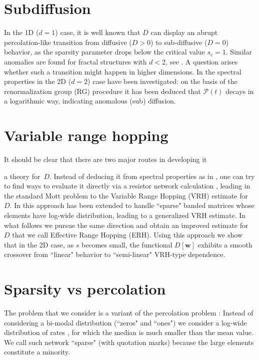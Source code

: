 \section{Subdiffusion}
In the 1D ($d{=}1$) case, it is well known \cite{alexander} that $D$ can display an abrupt 
percolation-like transition from diffusive (${D>0}$) to sub-diffusive (${D=0}$) 
behavior, as the sparsity parameter drops below the critical value ${s_c=1}$.
Similar anomalies are found for fractal structures with ${d<2}$, see \cite{granek,havlin}. 
A question arises whether such a transition might happen in higher dimensions.  
In \cite{amir} the spectral properties in the 2D ($d{=}2$) case 
have been investigated: on the basis of the renormalization group (RG) procedure 
it has been deduced that $\mathcal{P}(t)$ decays in a logarithmic way, 
indicating anomalous (sub) diffusion.  


\section{Variable range hopping}
It should be clear that there are two major routes in developing  it

a theory for~$D$. Instead of deducing it from spectral properties 
as in \cite{amir}, one can try to find ways to evaluate it directly 
via a resistor network calculation \cite{miller,AHL,Halp,pollak,VRHbook}, 
leading in the standard Mott problem to the Variable Range Hopping (VRH)
estimate for~$D$.   
%
In \cite{kbd,kbw,slk} this approach has been extended 
to handle ``sparse" banded matrices whose elements have log-wide distribution, 
leading to a generalized VRH estimate. 
In what follows we pursue the same direction and obtain an 
improved estimate for~$D$ that we call Effective Range Hopping (ERH).
Using this approach we show that in the 2D case, as $s$ becomes small, 
the functional $D[\bm{w}]$ exhibits a smooth crossover from ``linear" behavior  
to ``semi-linear" VRH-type dependence.  


\section{Sparsity vs percolation}
The problem that we consider is a variant of the percolation problem \cite{aa1,aa2}:
Instead of considering a bi-modal distribution (``zeros" and ``ones")
we consider a log-wide distribution of rates 
\cite{halperin_remarks_1989}, 
for which the median is much smaller than the mean value. 
We call such network ``sparse" (with quotation marks) because 
the large elements constitute a minority.

